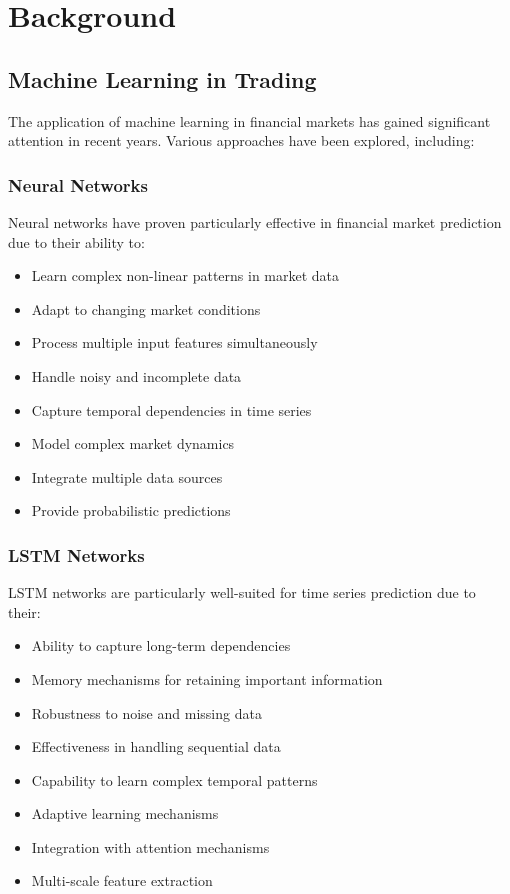 \documentclass[conference]{IEEEtran}
\begin{document}
\section{Background}
\subsection{Machine Learning in Trading}
The application of machine learning in financial markets has gained significant attention in recent years. Various approaches have been explored, including:

\subsubsection{Neural Networks}
Neural networks have proven particularly effective in financial market prediction due to their ability to:
\begin{itemize}
    \item Learn complex non-linear patterns in market data
    \item Adapt to changing market conditions
    \item Process multiple input features simultaneously
    \item Handle noisy and incomplete data
    \item Capture temporal dependencies in time series
    \item Model complex market dynamics
    \item Integrate multiple data sources
    \item Provide probabilistic predictions
\end{itemize}

\subsubsection{LSTM Networks}
LSTM networks are particularly well-suited for time series prediction due to their:
\begin{itemize}
    \item Ability to capture long-term dependencies
    \item Memory mechanisms for retaining important information
    \item Robustness to noise and missing data
    \item Effectiveness in handling sequential data
    \item Capability to learn complex temporal patterns
    \item Adaptive learning mechanisms
    \item Integration with attention mechanisms
    \item Multi-scale feature extraction
\end{itemize}
\end{document}
